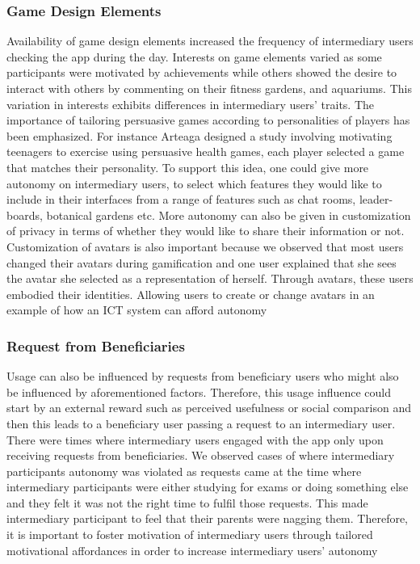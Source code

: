 \documentclass{sig-alternate}
\begin{document}
\subsubsection*{\textbf{Game Design Elements}} Availability of game design elements increased the frequency of intermediary users checking the app during the day. Interests on game elements varied as some participants were motivated by achievements while others showed the desire to interact with others by commenting on their fitness gardens, and aquariums. This variation in interests exhibits differences in intermediary users' traits. The importance of tailoring persuasive games according to personalities of players has been emphasized\cite{orji2013:tailoring}. For instance Arteaga \cite{arteaga2010:persuasive} designed a study involving motivating teenagers to exercise using persuasive health games, each player selected a game that matches their personality. To support this idea, one could give more autonomy on intermediary users, to select which features they would like to include in their interfaces from a range of features such as chat rooms, leader-boards, botanical gardens etc. More autonomy can also be given in customization of privacy in terms of whether they would like to share their information or not. Customization of avatars is also important because we observed that most users changed their avatars during gamification and one user explained that she sees the avatar she selected as a representation of herself. Through avatars, these users embodied their identities. Allowing users to create or change avatars in an example of how an ICT system can afford autonomy \cite{zhang2008:motivational}
\subsubsection*{\textbf{Request from Beneficiaries}}  
Usage can also be influenced by requests from beneficiary users who might also be influenced by  aforementioned factors. Therefore, this usage influence could start by an external reward such as perceived usefulness or social comparison and then this leads to a beneficiary user passing a request to an intermediary user. There were times where intermediary users engaged with the app only upon receiving requests from beneficiaries.  We observed cases of where intermediary participants autonomy was violated as requests came at the time where intermediary participants were either studying for exams or doing something else and they felt it was not the right time to fulfil those requests. This made intermediary participant to feel that their parents were nagging them. Therefore, it is important to foster motivation of intermediary users through tailored motivational affordances in order to increase intermediary users' autonomy\newline
\end{document}
